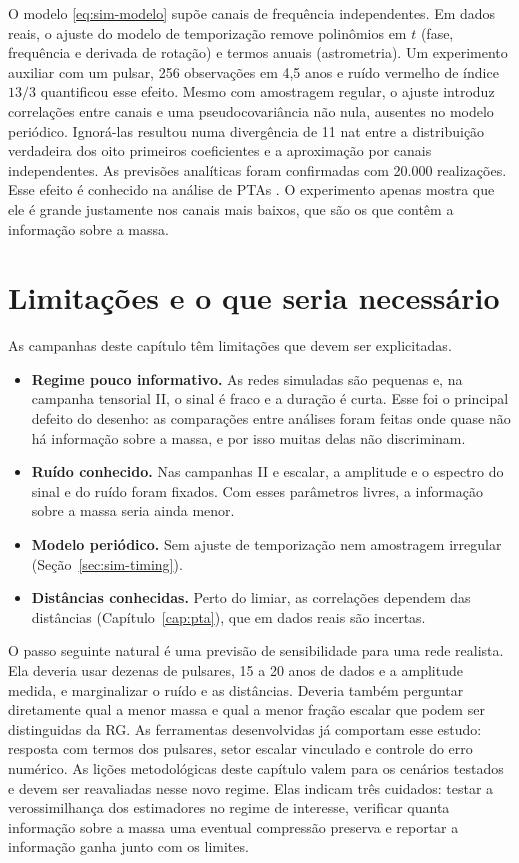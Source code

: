 O modelo \eqref{eq:sim-modelo} supõe canais de frequência independentes.
Em dados reais, o ajuste do modelo de temporização remove polinômios em
$t$ (fase, frequência e derivada de rotação) e termos anuais
(astrometria). Um experimento auxiliar com um pulsar, 256 observações em
4,5 anos e ruído vermelho de índice $13/3$ quantificou esse efeito.
Mesmo com amostragem regular, o ajuste introduz correlações entre
canais e uma pseudocovariância não nula, ausentes no modelo periódico.
Ignorá-las resultou numa divergência de 11 nat entre a distribuição
verdadeira dos oito primeiros coeficientes e a aproximação por canais
independentes. As previsões analíticas foram confirmadas com 20.000
realizações. Esse efeito é conhecido na análise de PTAs
\autocite{vanhaasteren2013}. O experimento apenas mostra que ele é
grande justamente nos canais mais baixos, que são os que contêm a
informação sobre a massa.

\section{Limitações e o que seria necessário}
\label{sec:sim-limitacoes}

As campanhas deste capítulo têm limitações que devem ser explicitadas.
\begin{itemize}
 \item \textbf{Regime pouco informativo.} As redes simuladas são pequenas
 e, na campanha tensorial II, o sinal é fraco e a duração é curta. Esse
 foi o principal defeito do desenho: as comparações entre análises foram
 feitas onde quase não há informação sobre a massa, e por isso muitas
 delas não discriminam.
 \item \textbf{Ruído conhecido.} Nas campanhas II e escalar, a amplitude
 e o espectro do sinal e do ruído foram fixados. Com esses parâmetros
 livres, a informação sobre a massa seria ainda menor.
 \item \textbf{Modelo periódico.} Sem ajuste de temporização nem
 amostragem irregular (Seção~\ref{sec:sim-timing}).
 \item \textbf{Distâncias conhecidas.} Perto do limiar, as correlações
 dependem das distâncias (Capítulo~\ref{cap:pta}), que em dados reais são
 incertas.
\end{itemize}

O passo seguinte natural é uma previsão de sensibilidade para uma rede
realista. Ela deveria usar dezenas de pulsares, 15 a 20 anos de dados e
a amplitude medida, e marginalizar o ruído e as distâncias. Deveria
também perguntar diretamente qual a menor massa e qual a menor fração
escalar que podem ser distinguidas da RG. As ferramentas desenvolvidas
já comportam esse estudo: resposta com termos dos pulsares, setor
escalar vinculado e controle do erro numérico. As lições metodológicas
deste capítulo valem para os cenários testados e devem ser reavaliadas
nesse novo regime. Elas indicam três cuidados: testar a verossimilhança
dos estimadores no regime de interesse, verificar quanta informação
sobre a massa uma eventual compressão preserva e reportar a informação
ganha junto com os limites.
